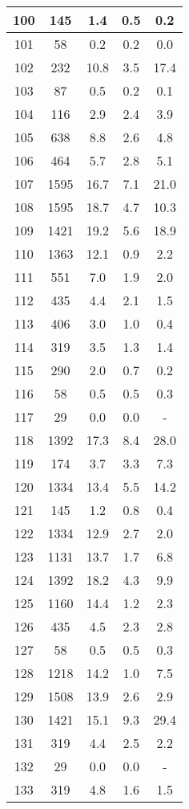 \documentclass[a4paper,10pt]{article}
\begin{document}
\begin{table}
\begin{tabular}{|c|c|c|c|c|}
100 & 145 & 1.4 & 0.5 & 0.2 \\
\hline
101 & 58 & 0.2 & 0.2 & 0.0 \\
\hline
102 & 232 & 10.8 & 3.5 & 17.4 \\
\hline
103 & 87 & 0.5 & 0.2 & 0.1 \\
\hline
104 & 116 & 2.9 & 2.4 & 3.9 \\
\hline
105 & 638 & 8.8 & 2.6 & 4.8 \\
\hline
106 & 464 & 5.7 & 2.8 & 5.1 \\
\hline
107 & 1595 & 16.7 & 7.1 & 21.0 \\
\hline
108 & 1595 & 18.7 & 4.7 & 10.3 \\
\hline
109 & 1421 & 19.2 & 5.6 & 18.9 \\
\hline
110 & 1363 & 12.1 & 0.9 & 2.2 \\
\hline
111 & 551 & 7.0 & 1.9 & 2.0 \\
\hline
112 & 435 & 4.4 & 2.1 & 1.5 \\
\hline
113 & 406 & 3.0 & 1.0 & 0.4 \\
\hline
114 & 319 & 3.5 & 1.3 & 1.4 \\
\hline
115 & 290 & 2.0 & 0.7 & 0.2 \\
\hline
116 & 58 & 0.5 & 0.5 & 0.3 \\
\hline
117 & 29 & 0.0 & 0.0 & - \\
\hline
118 & 1392 & 17.3 & 8.4 & 28.0 \\
\hline
119 & 174 & 3.7 & 3.3 & 7.3 \\
\hline
120 & 1334 & 13.4 & 5.5 & 14.2 \\
\hline
121 & 145 & 1.2 & 0.8 & 0.4 \\
\hline
122 & 1334 & 12.9 & 2.7 & 2.0 \\
\hline
123 & 1131 & 13.7 & 1.7 & 6.8 \\
\hline
124 & 1392 & 18.2 & 4.3 & 9.9 \\
\hline
125 & 1160 & 14.4 & 1.2 & 2.3 \\
\hline
126 & 435 & 4.5 & 2.3 & 2.8 \\
\hline
127 & 58 & 0.5 & 0.5 & 0.3 \\
\hline
128 & 1218 & 14.2 & 1.0 & 7.5 \\
\hline
129 & 1508 & 13.9 & 2.6 & 2.9 \\
\hline
130 & 1421 & 15.1 & 9.3 & 29.4 \\
\hline
131 & 319 & 4.4 & 2.5 & 2.2 \\
\hline
132 & 29 & 0.0 & 0.0 & - \\
\hline
133 & 319 & 4.8 & 1.6 & 1.5 \\

\end{tabular}
\end{table}
\end{document}
